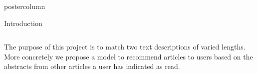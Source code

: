 \documentclass[final,hyperref={pdfpagelabels=false}]{beamer}
\begin{document}
\begin{frame}
\begin{columns}
\begin{column}{.49\paperwidth}
\begin{beamercolorbox}[center,wd=\textwidth]{postercolumn}
\begin{minipage}[T]{.99\textwidth}
{\begin{block}{Introduction}
\begin{columns}
\begin{column}{1\textwidth}
\begin{minipage}[t]{0.98\textwidth}
{The purpose of this project is to match two text descriptions of varied lengths. More concretely we propose a model to recommend articles to users based on the abstracts from other articles a user has indicated as read.
\vspace{0.5cm}
}



\end{minipage} \hspace{1cm}


      
\end{column}
 \end{columns}
 \end{block}
 \vfill



\vfill

}
\end{minipage}
\end{beamercolorbox}
\end{column}
\end{columns}
\end{frame}
\end{document}
